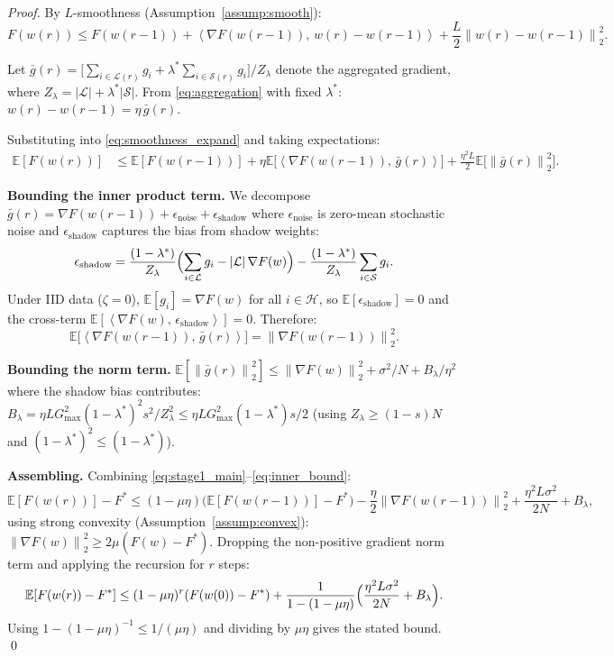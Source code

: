 \documentclass{article}
\newcommand{\E}{\mathbb{E}}
\newcommand{\norm}[1]{\left\lVert #1 \right\rVert}
\newcommand{\inner}[2]{\left\langle #1,\, #2 \right\rangle}
\newcommand{\calH}{\mathcal{H}}
\newcommand{\calS}{\mathcal{S}}
\newcommand{\calL}{\mathcal{L}}
\newcommand{\gF}{\nabla F}
\begin{document}
\begin{proof}
By $L$-smoothness (Assumption~\ref{assump:smooth}):
\begin{equation}
  F(w(r)) \leq F(w(r-1)) + \inner{\gF(w(r-1))}{w(r) - w(r-1)}
  + \frac{L}{2}\norm{w(r) - w(r-1)}_2^2.
  \label{eq:smoothness_expand}
\end{equation}

Let $\bar{g}(r) = \bigl[\sum_{i \in \calL(r)} g_i + \lambda^* \sum_{i \in \calS(r)} g_i\bigr] / Z_\lambda$
denote the aggregated gradient, where $Z_\lambda = |\calL| + \lambda^* |\calS|$.
From \eqref{eq:aggregation} with fixed $\lambda^*$:
$w(r) - w(r-1) = \eta\,\bar{g}(r)$.

Substituting into \eqref{eq:smoothness_expand} and taking expectations:
\begin{align}
  \E[F(w(r))]
  &\leq \E[F(w(r-1))] + \eta\E\bigl[\inner{\gF(w(r-1))}{\bar{g}(r)}\bigr]
  + \frac{\eta^2 L}{2}\E\bigl[\norm{\bar{g}(r)}_2^2\bigr].
  \label{eq:stage1_main}
\end{align}

\textbf{Bounding the inner product term.}
We decompose $\bar{g}(r) = \gF(w(r-1)) + \epsilon_{\mathrm{noise}} + \epsilon_{\mathrm{shadow}}$
where $\epsilon_{\mathrm{noise}}$ is zero-mean stochastic noise and
$\epsilon_{\mathrm{shadow}}$ captures the bias from shadow weights:
\[
  \epsilon_{\mathrm{shadow}}
  = \frac{(1-\lambda^*)}{Z_\lambda}
    \Bigl(\sum_{i \in \calL} g_i - |\calL|\,\gF(w)\Bigr)
  - \frac{(1-\lambda^*)}{Z_\lambda}\sum_{i \in \calS} g_i.
\]
Under IID data ($\zeta = 0$), $\E[g_i] = \gF(w)$ for all $i \in \calH$,
so $\E[\epsilon_{\mathrm{shadow}}] = 0$ and the cross-term
$\E[\inner{\gF(w)}{\epsilon_{\mathrm{shadow}}}] = 0$.
Therefore:
\begin{equation}
  \E\bigl[\inner{\gF(w(r-1))}{\bar{g}(r)}\bigr]
  = \norm{\gF(w(r-1))}_2^2.
  \label{eq:inner_bound}
\end{equation}

\textbf{Bounding the norm term.}
$\E[\norm{\bar{g}(r)}_2^2] \leq \norm{\gF(w)}_2^2 + \sigma^2/N + B_\lambda / \eta^2$
where the shadow bias contributes:
$B_\lambda = \eta L G_{\max}^2 (1-\lambda^*)^2 s^2 / Z_\lambda^2 \leq \eta L G_{\max}^2 (1-\lambda^*) s / 2$
(using $Z_\lambda \geq (1-s)N$ and $(1-\lambda^*)^2 \leq (1-\lambda^*)$).

\textbf{Assembling.}
Combining \eqref{eq:stage1_main}--\eqref{eq:inner_bound}:
\[
  \E[F(w(r))] - F^*
  \leq (1 - \mu\eta)\bigl(\E[F(w(r-1))] - F^*\bigr)
  - \frac{\eta}{2}\norm{\gF(w(r-1))}_2^2
  + \frac{\eta^2 L \sigma^2}{2N} + B_\lambda,
\]
using strong convexity (Assumption~\ref{assump:convex}):
$\norm{\gF(w)}_2^2 \geq 2\mu(F(w) - F^*)$.
Dropping the non-positive gradient norm term and applying the recursion for $r$ steps:
\[
  \E[F(w(r)) - F^*]
  \leq (1-\mu\eta)^r(F(w(0)) - F^*)
  + \frac{1}{1-(1-\mu\eta)}\Bigl(\frac{\eta^2 L\sigma^2}{2N} + B_\lambda\Bigr).
\]
Using $1 - (1-\mu\eta)^{-1} \leq 1/(\mu\eta)$ and dividing by $\mu\eta$
gives the stated bound. \qed
\end{proof}
\end{document}
